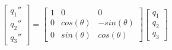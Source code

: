 \begin{equation}
	\begin{bmatrix}
		q_1'' \\
		q_2'' \\
		q_3''
	\end{bmatrix}
	=
	\begin{bmatrix}
		1 & 0           & 0            \\
		0 & cos(\theta) & -sin(\theta) \\
		0 & sin(\theta) & cos(\theta)
	\end{bmatrix}
	\begin{bmatrix}
		q_1 \\
		q_2 \\
		q_3
	\end{bmatrix}
\end{equation}




